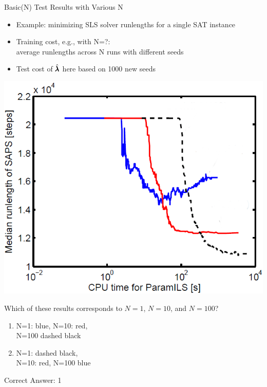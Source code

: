 \begin{frame}[fragile]{Basic(N) Test Results with Various N}

\begin{itemize}
\item Example: minimizing SLS solver runlengths for a single SAT instance
\item \alert{Training cost}, e.g., with N=?:\\average runlengths across N runs with different seeds
\item \alert{Test cost} of $\hat{\pmb{\lambda}}$ here based on 1000 new seeds 
\end{itemize}	

\pause

\begin{multicols}{2}
\begin{center}
	\includegraphics[scale=0.2]{images/basicils_unlabled.png}
\end{center}
\columnbreak{}
\pause
Which of these results corresponds to $N=1$, $N=10$, and $N=100$?\\


\pause
\medskip

\begin{enumerate}
	\item N=1: blue, N=10: red,\\ N=100 dashed black
	\item N=1: dashed black,\\ N=10: red, N=100 blue
\end{enumerate}

\pause
Correct Answer: 1


\end{multicols}


\end{frame}



